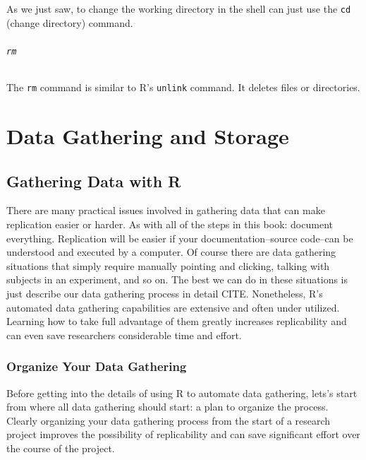 \documentclass[ChapterTOCs,krantz1]{krantz}\usepackage{graphicx, color}
\begin{document}
As we just saw, to change the working directory in the shell can just use the {\tt{cd}} (change directory) command.

\paragraph{{\tt{rm}}}

The {\tt{rm}} command is similar to R's {\tt{unlink}} command. It deletes files or directories.


\part{Data Gathering and Storage}





\chapter{Gathering Data with R}\label{DataGather}

There are many practical issues involved in gathering data that can make replication easier or harder. As with all of the steps in this book: document everything. Replication will be easier if your documentation--source code--can be understood and executed by a computer. Of course there are data gathering situations that simply require manually pointing and clicking, talking with subjects in an experiment, and so on. The best we can do in these situations is just describe our data gathering process in detail CITE. Nonetheless, R's automated data gathering capabilities are extensive and often under utilized. Learning how to take full advantage of them greatly increases replicability and can even save researchers considerable time and effort.

\section{Organize Your Data Gathering}

Before getting into the details of using R to automate data gathering, lets's start from where all data gathering should start: a plan to organize the process. Clearly organizing your data gathering process from the start of a research project improves the possibility of replicability and can save significant effort over the course of the project. 
\end{document}
